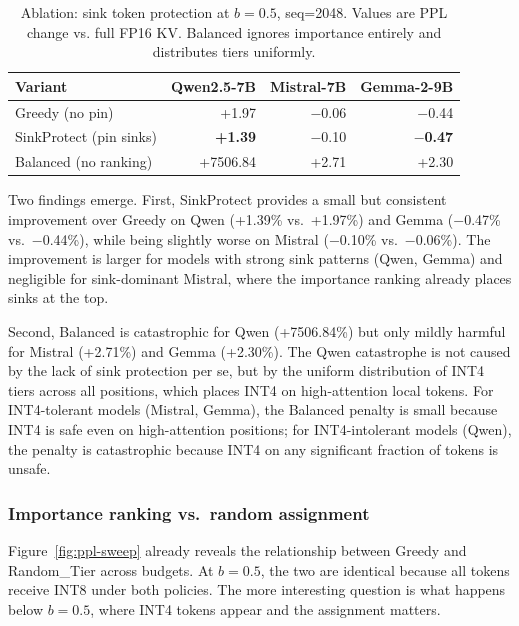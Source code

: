 \documentclass[11pt]{article}
\newcommand{\budget}{b}
\newcommand{\pct}{\%}
\theoremstyle{plain}
\theoremstyle{definition}
\begin{document}
\begin{table}[t]
\centering
\caption{Ablation: sink token protection at $\budget=0.5$, seq=2048.  Values are PPL change vs. full FP16 KV.  Balanced ignores importance entirely and distributes tiers uniformly.}
\label{tab:ablation-sink}
\small
\begin{tabular}{lrrr}
\toprule
Variant & Qwen2.5-7B & Mistral-7B & Gemma-2-9B \\
\midrule
Greedy (no pin) & +1.97 & $-$0.06 & $-$0.44 \\
SinkProtect (pin sinks) & \textbf{+1.39} & $-$0.10 & \textbf{$-$0.47} \\
Balanced (no ranking) & +7506.84 & +2.71 & +2.30 \\
\bottomrule
\end{tabular}
\end{table}

Two findings emerge.  First, SinkProtect provides a small but consistent improvement over Greedy on Qwen (+1.39\pct{} vs.\ +1.97\pct{}) and Gemma ($-$0.47\pct{} vs.\ $-$0.44\pct{}), while being slightly worse on Mistral ($-$0.10\pct{} vs.\ $-$0.06\pct{}).  The improvement is larger for models with strong sink patterns (Qwen, Gemma) and negligible for sink-dominant Mistral, where the importance ranking already places sinks at the top.

Second, Balanced is catastrophic for Qwen (+7506.84\pct{}) but only mildly harmful for Mistral (+2.71\pct{}) and Gemma (+2.30\pct{}).  The Qwen catastrophe is not caused by the lack of sink protection per se, but by the uniform distribution of INT4 tiers across all positions, which places INT4 on high-attention local tokens.  For INT4-tolerant models (Mistral, Gemma), the Balanced penalty is small because INT4 is safe even on high-attention positions; for INT4-intolerant models (Qwen), the penalty is catastrophic because INT4 on any significant fraction of tokens is unsafe.

\subsubsection{Importance ranking vs.\ random assignment}
\label{sec:ablation-ranking}

Figure~\ref{fig:ppl-sweep} already reveals the relationship between Greedy and Random\_Tier across budgets.  At $\budget=0.5$, the two are identical because all tokens receive INT8 under both policies.  The more interesting question is what happens below $\budget=0.5$, where INT4 tokens appear and the assignment matters.
\end{document}
